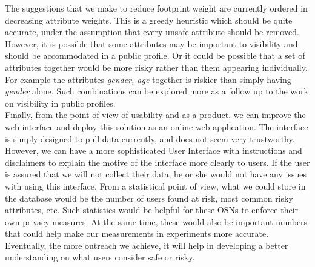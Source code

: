 \documentclass[10pt,conference]{IEEEtran}
\begin{document}
The suggestions that we make to reduce footprint weight are currently ordered in decreasing attribute weights. This is a greedy heuristic which should be quite accurate, under the assumption that every unsafe attribute should be removed. However, it is possible that some attributes may be important to visibility and should be accommodated in a public profile. Or it could be possible that a set of attributes together would be more risky rather than them appearing individually. For example the attributes \textit{gender, age} together is riskier than simply having \textit{gender} alone. Such combinations can be explored more as a follow up to the work on visibility in public profiles.\\

Finally, from the point of view of usability and as a product, we can improve the web interface and deploy this solution as an online web application. The interface is simply designed to pull data currently, and does not seem very trustworthy. However, we can have a more sophisticated User Interface with instructions and disclaimers to explain the motive of the interface more clearly to users. If the user is assured that we will not collect their data, he or she would not have any issues with using this interface. From a statistical point of view, what we could store in the database would be the number of users found at risk, most common risky attributes, etc. Such statistics would be helpful for these OSNs to enforce their own privacy measures. At the same time, these would also be important numbers that could help make our measurements in experiments more accurate. Eventually, the more outreach we achieve, it will help in developing a better understanding on what users consider safe or risky. \\
\end{document}
